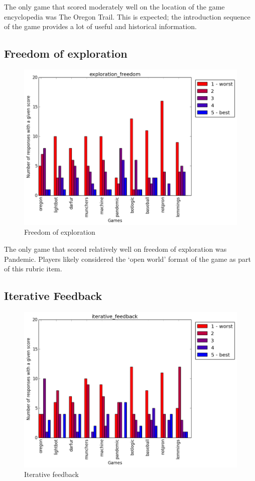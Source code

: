 				The only game that scored moderately well on the location of the game encyclopedia was The Oregon Trail. This is expected; the introduction sequence of the game provides a lot of useful and historical information.

			\subsection{Freedom of exploration}
				\begin{figure}[] 
				\centering 
				\includegraphics[width=\textwidth, height=.4\textheight, keepaspectratio=true]{exploration_freedom_scores.png} 
				\caption{Freedom of exploration}
				\end{figure}

				The only game that scored relatively well on freedom of exploration was Pandemic. Players likely considered the `open world' format of the game as part of this rubric item.

			\subsection{Iterative Feedback}
				\begin{figure}[] 
				\centering 
				\includegraphics[width=\textwidth, height=.4\textheight, keepaspectratio=true]{iterative_feedback_scores.png} 
				\caption{Iterative feedback}
				\end{figure}

